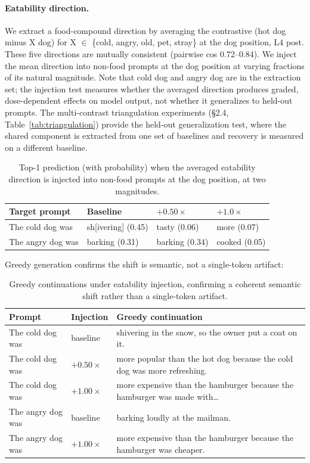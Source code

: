 \documentclass[11pt]{article}
\begin{document}
\paragraph{Eatability direction.} We extract a food-compound direction by averaging the
contrastive (hot dog minus X dog) for X $\in$ \{cold, angry, old, pet, stray\} at
the dog position, L4 post. These five directions are mutually consistent
(pairwise cos 0.72--0.84). We inject the mean direction into non-food prompts
at the dog position at varying fractions of its natural magnitude. Note that
cold dog and angry dog are in the extraction set; the injection test measures
whether the averaged direction produces graded, dose-dependent effects on
model output, not whether it generalizes to held-out prompts. The
multi-contrast triangulation experiments (\S2.4, Table~\ref{tab:triangulation}) provide the held-out
generalization test, where the shared component is extracted from one set of
baselines and recovery is measured on a different baseline.

\begin{table}[htbp]
\centering
\small
\begin{tabular}{llll}
\toprule
Target prompt & Baseline & $+0.50\times$ & $+1.0\times$ \\
\midrule
The cold dog was & sh[ivering] (0.45) & tasty (0.06) & more (0.07) \\
The angry dog was & barking (0.31) & barking (0.34) & cooked (0.05) \\
\bottomrule
\end{tabular}
\caption{Top-1 prediction (with probability) when the averaged eatability direction is injected into non-food prompts at the dog position, at two magnitudes.}
\label{tab:eatability-dose}
\end{table}

Greedy generation confirms the shift is semantic, not a single-token
artifact:

\begin{table}[htbp]
\centering
\small
\begin{tabularx}{\textwidth}{llY}
\toprule
Prompt & Injection & Greedy continuation \\
\midrule
The cold dog was & baseline & shivering in the snow, so the owner put a coat on it. \\
The cold dog was & $+0.50\times$ & more popular than the hot dog because the cold dog was more refreshing. \\
The cold dog was & $+1.00\times$ & more expensive than the hamburger because the hamburger was made with\ldots \\
The angry dog was & baseline & barking loudly at the mailman. \\
The angry dog was & $+1.00\times$ & more expensive than the hamburger because the hamburger was cheaper. \\
\bottomrule
\end{tabularx}
\caption{Greedy continuations under eatability injection, confirming a coherent semantic shift rather than a single-token artifact.}
\label{tab:eatability-greedy}
\end{table}
\end{document}
